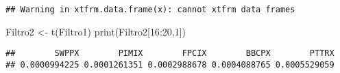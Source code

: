 \documentclass[
]{article}
\newenvironment{Shaded}{\begin{snugshade}}{\end{snugshade}}
\newcommand{\DecValTok}[1]{\textcolor[rgb]{0.00,0.00,0.81}{#1}}
\newcommand{\FunctionTok}[1]{\textcolor[rgb]{0.00,0.00,0.00}{#1}}
\newcommand{\NormalTok}[1]{#1}
\newcommand{\OtherTok}[1]{\textcolor[rgb]{0.56,0.35,0.01}{#1}}
\newcommand{\SpecialCharTok}[1]{\textcolor[rgb]{0.00,0.00,0.00}{#1}}
\begin{document}
\begin{verbatim}
## Warning in xtfrm.data.frame(x): cannot xtfrm data frames
\end{verbatim}

\begin{Shaded}
\begin{Highlighting}[]
\NormalTok{Filtro2 }\OtherTok{\textless{}{-}} \FunctionTok{t}\NormalTok{(Filtro1)}
\FunctionTok{print}\NormalTok{(Filtro2[}\DecValTok{16}\SpecialCharTok{:}\DecValTok{20}\NormalTok{,}\DecValTok{1}\NormalTok{])}
\end{Highlighting}
\end{Shaded}

\begin{verbatim}
##        SWPPX        PIMIX        FPCIX        BBCPX        PTTRX 
## 0.0000994225 0.0001261351 0.0002988678 0.0004088765 0.0005529059
\end{verbatim}
\end{document}
